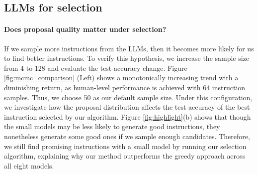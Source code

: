 
\subsection{LLMs for selection}
\paragraph{Does proposal quality matter under selection?} If we sample more instructions from the LLMs, then it becomes more likely for us to find better instructions. To verify this hypothesis, we increase the sample size from 4 to 128 and evaluate the test accuracy change. Figure \ref{fig:mcmc_comparison} (Left) shows a monotonically increasing trend with a diminishing return, as human-level performance is achieved with 64 instruction samples. Thus, we choose 50 as our default sample size. Under this configuration, we investigate how the proposal distribution affects the test accuracy of the best instruction selected by our algorithm. Figure \ref{fig:highlight}(b) shows that though the small models may be less likely to generate good instructions, they nonetheless generate some good ones if we sample enough candidates. Therefore, we still find promising instructions with a small model by running our selection algorithm, explaining why our method outperforms the greedy approach \cite{honovich2022instruction} across all eight models.

